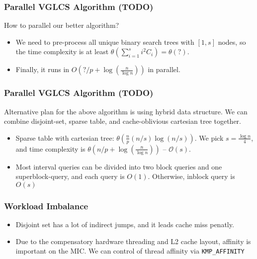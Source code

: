 \begin{frame}
	\frametitle{Parallel VGLCS Algorithm (TODO)}
	How to parallel our better algorithm?
	\begin{itemize}
		\setlength\itemsep{1em}
		\item We need to pre-process all unique binary search trees with $[1, s]$ nodes,
			so the time complexity is at least $\theta(\sum_{i = 1}^{s} i^2 C_i) =  \theta(?)$.
		\item Finally, it runs in $O(?/p + \log \left(\frac{n}{\log n}\right))$ in parallel.
	\end{itemize}
\end{frame}

\begin{frame}
	\frametitle{Parallel VGLCS Algorithm (TODO)}
	Alternative plan for the above algorithm is using hybrid data structure.
	We can combine disjoint-set, sparse table, and cache-oblivious cartesian tree together.
	\begin{itemize}
		\setlength\itemsep{1em}
		\item Sparse table with cartesian tree: $\mathcal{\theta}(\frac{n}{p} (n/s) \log (n/s))$.  
		We pick $s = \frac{\log n}{4}$, and time complexity is $\mathcal{\theta}\left(n/p + \log \left(\frac{n}{\log n}\right)\right)$ -- $\mathcal{O}(s)$.
		\item Most interval queries can be divided into two block queries
			and one superblock-query, and each query is $O(1)$. 
			Otherwise, inblock query is $O(s)$
	\end{itemize}
\end{frame}

\begin{frame}
	\frametitle{Workload Imbalance}
	\begin{itemize}
		\setlength\itemsep{1em}
		\item Disjoint set has a lot of indirect jumps, and it leads cache miss penatly.
		\item Due to the compensatory hardware threading and L2 cache layout, affinity 
			is important on the MIC. We can control of thread affinity via \tt{KMP\_AFFINITY}
	\end{itemize}
\end{frame}

